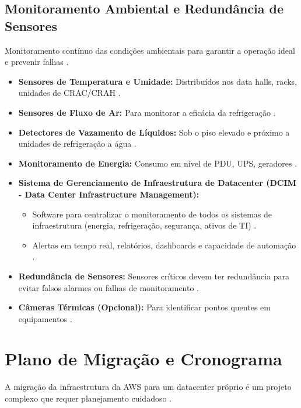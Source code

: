 \documentclass[
	12pt,				%
	oneside,			%
	a4paper,			%
	english,			%
	brazil				%
	]{abntex2unama}
\begin{document}
\section{Monitoramento Ambiental e Redundância de Sensores}
Monitoramento contínuo das condições ambientais para garantir a operação ideal e prevenir falhas \cite{datacenter_monitoring}.
\begin{itemize}
	\item \textbf{Sensores de Temperatura e Umidade:} Distribuídos nos data halls, racks, unidades de CRAC/CRAH \cite{cooling_technologies}.
	\item \textbf{Sensores de Fluxo de Ar:} Para monitorar a eficácia da refrigeração \cite{energy_efficiency}.
	\item \textbf{Detectores de Vazamento de Líquidos:} Sob o piso elevado e próximo a unidades de refrigeração a água \cite{liquid_cooling}.
	\item \textbf{Monitoramento de Energia:} Consumo em nível de PDU, UPS, geradores \cite{power_distribution}.
	\item \textbf{Sistema de Gerenciamento de Infraestrutura de Datacenter (DCIM - Data Center Infrastructure Management):}
	      \begin{itemize}
		      \item Software para centralizar o monitoramento de todos os sistemas de infraestrutura (energia, refrigeração, segurança, ativos de TI) \cite{dcim_systems}.
		      \item Alertas em tempo real, relatórios, dashboards e capacidade de automação \cite{dcim_evolution}.
	      \end{itemize}
	\item \textbf{Redundância de Sensores:} Sensores críticos devem ter redundância para evitar falsos alarmes ou falhas de monitoramento \cite{reliability_engineering}.
	\item \textbf{Câmeras Térmicas (Opcional):} Para identificar pontos quentes em equipamentos \cite{cooling_technologies}.
\end{itemize}

\chapter{Plano de Migração e Cronograma}
A migração da infraestrutura da AWS para um datacenter próprio é um projeto complexo que requer planejamento cuidadoso \cite{reliability_engineering}.
\end{document}

